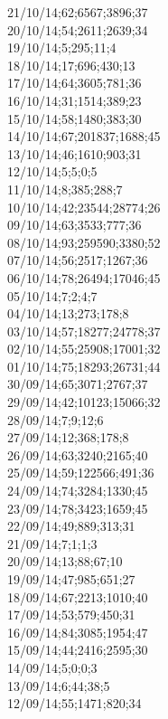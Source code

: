 21/10/14;62;6567;3896;37 \\
20/10/14;54;2611;2639;34 \\
19/10/14;5;295;11;4 \\
18/10/14;17;696;430;13 \\
17/10/14;64;3605;781;36 \\
16/10/14;31;1514;389;23 \\
15/10/14;58;1480;383;30 \\
14/10/14;67;201837;1688;45 \\
13/10/14;46;1610;903;31 \\
12/10/14;5;5;0;5 \\
11/10/14;8;385;288;7 \\
10/10/14;42;23544;28774;26 \\
09/10/14;63;3533;777;36 \\
08/10/14;93;259590;3380;52 \\
07/10/14;56;2517;1267;36 \\
06/10/14;78;26494;17046;45 \\
05/10/14;7;2;4;7 \\
04/10/14;13;273;178;8 \\
03/10/14;57;18277;24778;37 \\
02/10/14;55;25908;17001;32 \\
01/10/14;75;18293;26731;44 \\
30/09/14;65;3071;2767;37 \\
29/09/14;42;10123;15066;32 \\
28/09/14;7;9;12;6 \\
27/09/14;12;368;178;8 \\
26/09/14;63;3240;2165;40 \\
25/09/14;59;122566;491;36 \\
24/09/14;74;3284;1330;45 \\
23/09/14;78;3423;1659;45 \\
22/09/14;49;889;313;31 \\
21/09/14;7;1;1;3 \\
20/09/14;13;88;67;10 \\
19/09/14;47;985;651;27 \\
18/09/14;67;2213;1010;40 \\
17/09/14;53;579;450;31 \\
16/09/14;84;3085;1954;47 \\
15/09/14;44;2416;2595;30 \\
14/09/14;5;0;0;3 \\
13/09/14;6;44;38;5 \\
12/09/14;55;1471;820;34 \\
